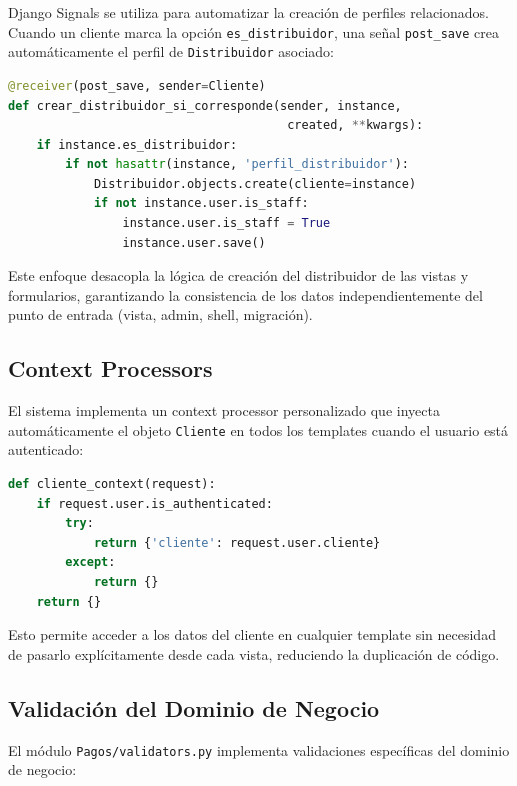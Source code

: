 \documentclass[12pt, a4paper]{article}
\begin{document}
Django Signals se utiliza para automatizar la creación de perfiles relacionados. Cuando un cliente marca la opción \texttt{es\_distribuidor}, una señal \texttt{post\_save} crea automáticamente el perfil de \texttt{Distribuidor} asociado:

\begin{lstlisting}[language=Python, caption={Signal para creación automática de distribuidor (Clientes/signals.py)}]
@receiver(post_save, sender=Cliente)
def crear_distribuidor_si_corresponde(sender, instance,
                                       created, **kwargs):
    if instance.es_distribuidor:
        if not hasattr(instance, 'perfil_distribuidor'):
            Distribuidor.objects.create(cliente=instance)
            if not instance.user.is_staff:
                instance.user.is_staff = True
                instance.user.save()
\end{lstlisting}

Este enfoque desacopla la lógica de creación del distribuidor de las vistas y formularios, garantizando la consistencia de los datos independientemente del punto de entrada (vista, admin, shell, migración).

\subsection{Context Processors}

El sistema implementa un context processor personalizado que inyecta automáticamente el objeto \texttt{Cliente} en todos los templates cuando el usuario está autenticado:

\begin{lstlisting}[language=Python, caption={Context processor (Clientes/context\_processors.py)}]
def cliente_context(request):
    if request.user.is_authenticated:
        try:
            return {'cliente': request.user.cliente}
        except:
            return {}
    return {}
\end{lstlisting}

Esto permite acceder a los datos del cliente en cualquier template sin necesidad de pasarlo explícitamente desde cada vista, reduciendo la duplicación de código.

\subsection{Validación del Dominio de Negocio}
\label{subsec:validators}

El módulo \texttt{Pagos/validators.py} implementa validaciones específicas del dominio de negocio:
\end{document}
